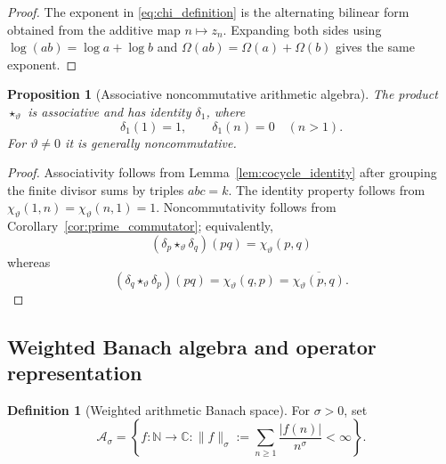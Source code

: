 \documentclass[11pt]{amsart}
\numberwithin{equation}{section}
\theoremstyle{plain}
\newtheorem{proposition}[theorem]{Proposition}
\theoremstyle{definition}
\newtheorem{definition}[theorem]{Definition}
\theoremstyle{remark}
\newcommand{\C}{\mathbb{C}}
\newcommand{\N}{\mathbb{N}}
\newcommand{\Om}{\Omega}
\newcommand{\twconv}{\star_{\vartheta}}
\newcommand{\deltaone}{\delta_{1}}
\begin{document}
\begin{proof}
The exponent in \eqref{eq:chi_definition} is the alternating bilinear form
obtained from the additive map $n\mapsto z_n$.  Expanding both sides using
$\log(ab)=\log a+\log b$ and
$\Om(ab)=\Om(a)+\Om(b)$ gives the same exponent.
\end{proof}

\begin{proposition}[Associative noncommutative arithmetic algebra]
\label{prop:twisted_associative}
The product $\twconv$ is associative and has identity $\deltaone$, where
\begin{equation}
\deltaone(1)=1,
\qquad
\deltaone(n)=0\quad(n>1).
\label{eq:delta_one_definition}
\end{equation}
For $\vartheta\neq0$ it is generally noncommutative.
\end{proposition}

\begin{proof}
Associativity follows from Lemma~\ref{lem:cocycle_identity} after grouping
the finite divisor sums by triples $abc=k$.  The identity property follows
from $\chi_{\vartheta}(1,n)=\chi_{\vartheta}(n,1)=1$.  Noncommutativity
follows from Corollary~\ref{cor:prime_commutator}; equivalently,
\begin{equation}
(\delta_p\twconv\delta_q)(pq)
=
\chi_{\vartheta}(p,q)
\label{eq:delta_pq_forward}
\end{equation}
whereas
\begin{equation}
(\delta_q\twconv\delta_p)(pq)
=
\chi_{\vartheta}(q,p)
=
\overline{\chi_{\vartheta}(p,q)}.
\label{eq:delta_pq_reverse}
\end{equation}
\end{proof}

\subsection{Weighted Banach algebra and operator representation}
\label{subsec:weighted_banach_algebra}

\begin{definition}[Weighted arithmetic Banach space]
\label{def:weighted_banach_algebra}
For $\sigma>0$, set
\begin{equation}
\mathcal A_{\sigma}
=
\left\{f:\N\to\C:
\|f\|_{\sigma}:=
\sum_{n\ge1}\frac{|f(n)|}{n^{\sigma}}<\infty
\right\}.
\label{eq:A_sigma_definition}
\end{equation}
\end{definition}
\end{document}
